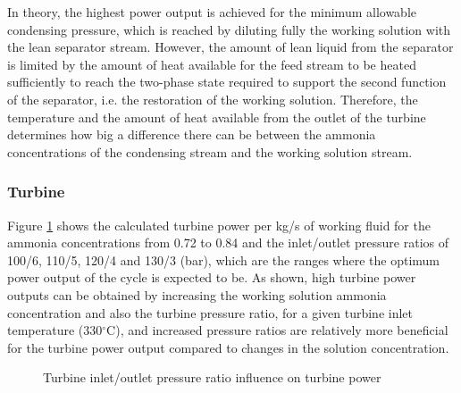 \documentclass[review,3p]{elsarticle}
\begin{document}
In theory, the highest power output is achieved for the minimum allowable condensing pressure, which is reached by diluting fully the working solution with the lean separator stream. However, the amount of lean liquid from the separator is limited by the amount of heat available for the feed stream to be heated sufficiently to reach the two-phase state required to support the second function of the separator, i.e. the restoration of the working solution. Therefore, the temperature and the amount of heat available from the outlet of the turbine determines how big a difference there can be between the ammonia concentrations of the condensing stream and the working solution stream. 


\subsubsection{Turbine}
Figure \ref{fig:wTurbVsPhigh} shows the calculated turbine power per kg/s of working fluid for the ammonia concentrations from 0.72 to 0.84 and the inlet/outlet pressure ratios of 100/6, 110/5, 120/4 and 130/3 (bar), which are the ranges where the optimum power output of the cycle is expected to be. As shown, high turbine power outputs can be obtained by increasing the working solution ammonia concentration and also the turbine pressure ratio, for a given turbine inlet temperature (330$^{\circ}$C), and increased pressure ratios are relatively more beneficial for the turbine power output compared to changes in the solution concentration.




\begin{figure}[htpb]
\centering
{}

\caption{Turbine inlet/outlet pressure ratio influence on turbine power}
\label{fig:wTurbVsPhigh}
\end{figure}
\end{document}
